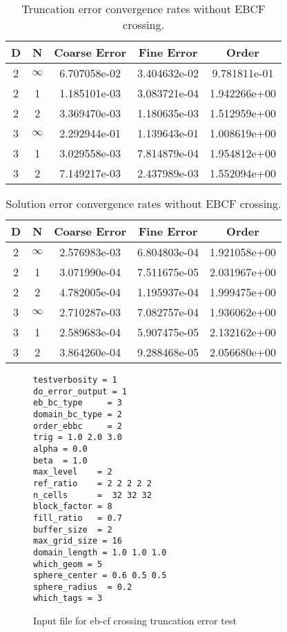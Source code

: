 \begin{table}
\begin{center}
\begin{tabular}{|c|c|c|c|c|} \hline
D & N &  Coarse Error & Fine Error & Order\\
\hline \hline 
2 & $\infty$ &    	 6.707058e-02 & 3.404632e-02 & 9.781811e-01 \\ 
2 & 1        &    	 1.185101e-03 & 3.083721e-04 & 1.942266e+00 \\ 
2 & 2        &   	 3.369470e-03 & 1.180635e-03 & 1.512959e+00 \\ 
3 & $\infty$ &    	 2.292944e-01 & 1.139643e-01 & 1.008619e+00 \\ 
3 & 1        &    	 3.029558e-03 & 7.814879e-04 & 1.954812e+00 \\
3 & 2        &   	 7.149217e-03 & 2.437989e-03 & 1.552094e+00 \\
\hline
\end{tabular}
\end{center}
\caption{Truncation error convergence rates without EBCF crossing.}
\label{results1}
\end{table}

\begin{table}
\begin{center}
\begin{tabular}{|c|c|c|c|c|} \hline
D & N &  Coarse Error & Fine Error & Order\\
\hline \hline 
2 & $\infty$ &   2.576983e-03 & 6.804803e-04 & 1.921058e+00 \\  	  
2 & 1        &   3.071990e-04 & 7.511675e-05 & 2.031967e+00 \\ 	  
2 & 2        &   4.782005e-04 & 1.195937e-04 & 1.999475e+00 \\ 	  
3 & $\infty$ &   2.710287e-03 & 7.082757e-04 & 1.936062e+00 \\ 	  
3 & 1        &   2.589683e-04 & 5.907475e-05 & 2.132162e+00 \\ 	 
3 & 2        &   3.864260e-04 & 9.288468e-05 & 2.056680e+00 \\	 
\hline
\end{tabular}
\end{center}
\caption{Solution error convergence rates without EBCF crossing.}
\label{results3}
\end{table}

\begin{figure}
\begin{tiny}
\begin{verbatim}
testverbosity = 1
do_error_output = 1
eb_bc_type     = 3
domain_bc_type = 2
order_ebbc     = 2
trig = 1.0 2.0 3.0
alpha = 0.0
beta  = 1.0
max_level    = 2
ref_ratio    = 2 2 2 2 2 
n_cells      =  32 32 32
block_factor = 8
fill_ratio   = 0.7
buffer_size  = 2
max_grid_size = 16
domain_length = 1.0 1.0 1.0
which_geom = 5
sphere_center = 0.6 0.5 0.5
sphere_radius  = 0.2
which_tags = 3
\end{verbatim}
\end{tiny}
\caption{Input file for eb-cf crossing truncation error test}
\label{input2}
\end{figure}

